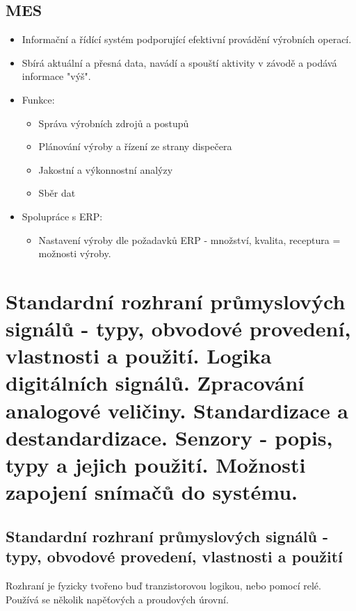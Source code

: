\subsection{MES}
\begin{itemize}
    \item Informační a řídící systém podporující efektivní provádění výrobních operací.
    \item Sbírá aktuální a přesná data, navádí a spouští aktivity v závodě a podává informace "výš".
    \item Funkce: \begin{itemize}
              \item Správa výrobních zdrojů a postupů
              \item Plánování výroby a řízení ze strany dispečera
              \item Jakostní a výkonnostní analýzy
              \item Sběr dat
          \end{itemize}
    \item Spolupráce s ERP: \begin{itemize}
              \item Nastavení výroby dle požadavků ERP - množství, kvalita, receptura = možnosti výroby.
          \end{itemize}
\end{itemize}

\section{Standardní rozhraní průmyslových signálů - typy, obvodové provedení, vlastnosti a použití. Logika digitálních signálů. Zpracování analogové veličiny. Standardizace a destandardizace. Senzory - popis, typy a jejich použití. Možnosti zapojení
  snímačů do systému.}

\subsection{Standardní rozhraní průmyslových signálů - typy, obvodové provedení, vlastnosti a použití}
Rozhraní je fyzicky tvořeno buď tranzistorovou logikou, nebo pomocí relé. Používá se několik napěťových a proudových úrovní.
